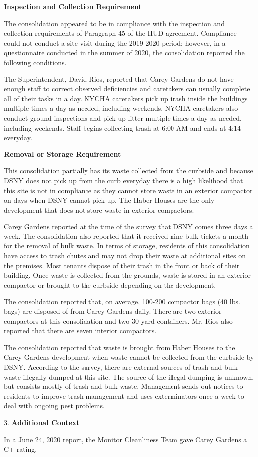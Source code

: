 

\textbf{Inspection and Collection Requirement}

The consolidation appeared to be in compliance with the inspection and collection requirements of Paragraph 45 of the HUD agreement. Compliance could not conduct a site visit during the 2019-2020 period; however, in a questionnaire conducted in the summer of 2020, the consolidation reported the following conditions.

The Superintendent, David Rios, reported that Carey Gardens do not have enough staff to correct observed deficiencies and caretakers can usually complete all of their tasks in a day. NYCHA caretakers pick up trash inside the buildings multiple times a day as needed, including weekends. NYCHA caretakers also conduct ground inspections and pick up litter multiple times a day as needed, including weekends. Staff begins collecting trash at 6:00 AM and ends at 4:14 everyday.

\textbf{Removal or Storage Requirement}

This consolidation partially has its waste collected from the curbside and because DSNY does not pick up from the curb everyday there is a high likelihood that this site is not in compliance as they cannot store waste in an exterior compactor on days when DSNY cannot pick up. The Haber Houses are the only development that does not store waste in exterior compactors.

Carey Gardens reported at the time of the survey that DSNY comes three days a week. The consolidation also reported that it received nine bulk tickets a month for the removal of bulk waste. In terms of storage, residents of this consolidation have access to trash chutes and may not drop their waste at additional sites on the premises. Most tenants dispose of their trash in the front or back of their building. Once waste is collected from the grounds, waste is stored in an exterior compactor or brought to the curbside depending on the development.

The consolidation reported that, on average, 100-200 compactor bags (40 lbs. bags)  are disposed of from Carey Gardens daily. There are two exterior compactors at this consolidation and two 30-yard containers. Mr. Rios also reported that there are seven interior compactors.

The consolidation reported that waste is brought from Haber Houses to the Carey Gardens development when waste cannot be collected from the curbside by DSNY. According to the survey, there are external sources of trash and bulk waste illegally dumped at this site. The source of the illegal dumping is unknown, but consists mostly of trash and bulk waste. Management sends out notices to residents to improve trash management and uses exterminators once a week to deal with ongoing pest problems.

3. \textbf{Additional Context} 

In a June 24, 2020 report, the Monitor Cleanliness Team gave Carey Gardens a C+ rating. 